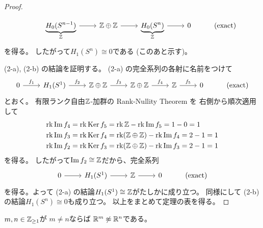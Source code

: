 \documentclass[report]{jlreq}
\begin{document}
\begin{proof}
\begin{enumerate}
\begin{enumerate}[label=(\arabic{enumi}-\alph*)]
\begin{equation}
\begin{tikzcd}
                                & \underbrace{H_0(S^{n - 1})}_{\Z} \ar{r}
                                & \Z \oplus \Z \ar{r}
                                & \underbrace{H_0(S^n)}_{\Z} \ar{r}
                                & 0
                                & (\text{exact})
                        \end{tikzcd}
                    \end{equation}
                    を得る。
                    したがって$H_1(S^n) \cong 0$である (このあと示す)。
            \end{enumerate}
    \end{enumerate}
    (2-a), (2-b) の結論を証明する。
    (2-a) の完全系列の各射に名前をつけて
    \begin{equation}
        \begin{tikzcd}
            0 \ar{r}{f_1}
                & H_1(S^1) \ar{r}{f_2}
                & \Z \oplus \Z \ar{r}{f_3}
                & \Z \oplus \Z \ar{r}{f_4}
                & \Z \ar{r}{f_5}
                & 0
                & (\text{exact})
        \end{tikzcd}
    \end{equation}
    とおく。
    有限ランク自由$\mathbb{Z}$-加群の Rank-Nullity Theorem を
    右側から順次適用して
    \begin{alignat}{1}
        \operatorname{rk}\operatorname{\mathrm{Im}} f_4 &= \operatorname{rk}\operatorname{\mathrm{Ker}} f_5 = \operatorname{rk}\mathbb{Z} - \operatorname{rk}\operatorname{\mathrm{Im}} f_5 = 1 - 0 = 1 \\
        \operatorname{rk}\operatorname{\mathrm{Im}} f_3 &= \operatorname{rk}\operatorname{\mathrm{Ker}} f_4 = \operatorname{rk}(\mathbb{Z} \oplus \mathbb{Z}) - \operatorname{rk}\operatorname{\mathrm{Im}} f_4 = 2 - 1 = 1 \\
        \operatorname{rk}\operatorname{\mathrm{Im}} f_2 &= \operatorname{rk}\operatorname{\mathrm{Ker}} f_3 = \operatorname{rk}(\mathbb{Z} \oplus \mathbb{Z}) - \operatorname{rk}\operatorname{\mathrm{Im}} f_3 = 2 - 1 = 1
    \end{alignat}
    を得る。
    したがって$\operatorname{\mathrm{Im}} f_2 \cong \mathbb{Z}$だから、完全系列
    \begin{equation}
        \begin{tikzcd}
            0 \ar{r}
                & H_1(S^1) \ar{r}
                & \Z \ar{r}
                & 0
                & (\text{exact})
        \end{tikzcd}
    \end{equation}
    を得る。よって (2-a) の結論$H_1(S^1) \cong \mathbb{Z}$がたしかに成り立つ。
    同様にして (2-b) の結論$H_1(S^n) \cong 0$も成り立つ。
    以上をまとめて定理の表を得る。
\end{proof}

\begin{corollary}
    $m, n \in \mathbb{Z}_{\ge 1}$が
    $m \neq n$ならば
    $\mathbb{R}^m \not\approx \mathbb{R}^n$である。
\end{corollary}
\end{document}
